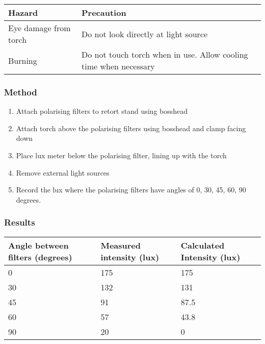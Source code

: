 \documentclass{report}
\begin{document}
			\begin{table}[H]
				\centering
				\begin{tabular}{p{7cm}|p{7cm}}
					\textbf{Hazard}			& \textbf{Precaution}		\\ \hline
					Eye damage from torch		& Do not look directly at light source \\
					Burning				& Do not touch torch when in use. Allow cooling time when necessary
				\end{tabular}
			\end{table}

		\subsubsection{Method}
			
			\begin{enumerate}
				\item Attach polarising filters to retort stand using bosshead
				\item Attach torch above the polarising filters using bosshead and clamp facing down
				\item Place lux meter below the polarising filter, lining up with the torch
				\item Remove external light sources
				\item Record the lux where the polarising filters have angles of 0, 30, 45, 60, 90 degrees.
			\end{enumerate}

		\subsubsection{Results}
		
			\begin{table}[H]
				\centering
				\begin{tabular}{p{6cm}|p{5cm}|p{5cm}}
					\textbf{Angle between filters (degrees)}& \textbf{Measured intensity (lux)}	& \textbf{Calculated Intensity (lux)}		\\ \hline
					0					& 175					& 175					\\
					30					& 132					& 131					\\
					45					& 91					& 87.5					\\
					60					& 57					& 43.8					\\
					90					& 20					& 0					\\
				\end{tabular}
			\end{table}
\end{document}
